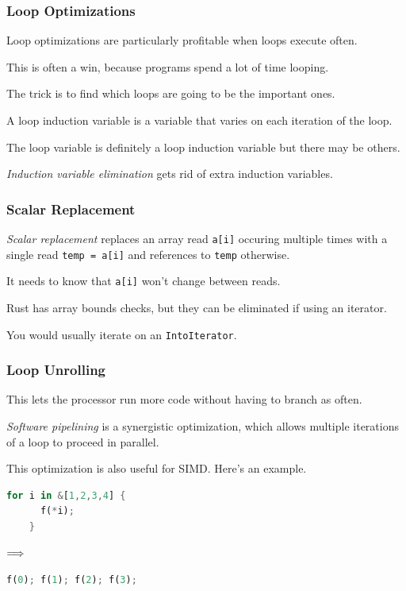 \begin{frame}
\frametitle{Loop Optimizations}

Loop optimizations are particularly profitable when loops execute
often. 

This is often a win, because programs spend a lot of time looping.


The trick is to find which loops are going to be the important ones.

A loop induction variable is a variable that varies on each iteration
of the loop. 

The loop variable is definitely a loop induction variable
but there may be others. 

\emph{Induction variable elimination} gets
rid of extra induction variables.



\end{frame}

\begin{frame}
\frametitle{Scalar Replacement}

\emph{Scalar replacement} replaces an array read {\tt a[i]}
occuring multiple times with a single read {\tt temp = a[i]} and references
to {\tt temp} otherwise. 

It needs to know that {\tt a[i]} won't change
between reads.

Rust has array bounds checks, but they can be eliminated if using an iterator.

You would usually iterate on an \texttt{IntoIterator}.


\end{frame}

\begin{frame}[fragile]
\frametitle{Loop Unrolling}

This
lets the processor run more code without having to branch
as often. 

\emph{Software pipelining} is a synergistic optimization,
which allows multiple iterations of a loop to proceed in parallel.


This optimization is also useful for SIMD. Here's an example.
\begin{center}
\vspace*{-1em}
\begin{minipage}{.3\textwidth}
  \begin{lstlisting}[language=Rust]
    for i in &[1,2,3,4] {
      f(*i);
    }
  \end{lstlisting}
  \end{minipage} $\Longrightarrow \hspace*{2em}$ \begin{minipage}{.4\textwidth}
  \begin{lstlisting}[language=Rust]
f(0); f(1); f(2); f(3);
  \end{lstlisting}
  \end{minipage}
  \end{center}

\end{frame}


